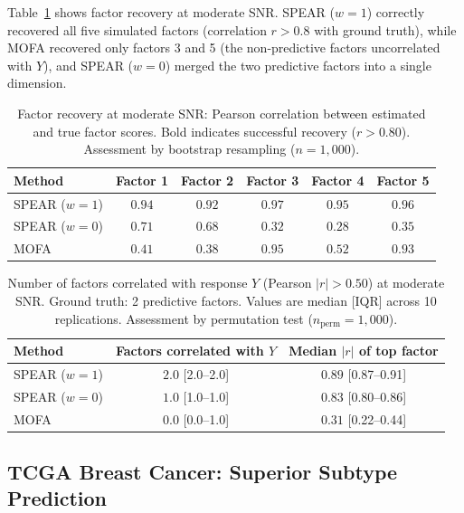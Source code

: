 \documentclass[11pt]{article}
\begin{document}
Table~\ref{tab:factor_recovery} shows factor recovery at moderate SNR. SPEAR ($w{=}1$) correctly recovered all five simulated factors (correlation $r > 0.8$ with ground truth), while MOFA recovered only factors 3 and 5 (the non-predictive factors uncorrelated with $Y$), and SPEAR ($w{=}0$) merged the two predictive factors into a single dimension.

\begin{table}[H]
\centering
\caption{Factor recovery at moderate SNR: Pearson correlation between estimated and true factor scores. Bold indicates successful recovery ($r > 0.80$). Assessment by bootstrap resampling ($n = 1{,}000$).}
\label{tab:factor_recovery}
\begin{tabular}{lccccc}
\toprule
Method & Factor 1 & Factor 2 & Factor 3 & Factor 4 & Factor 5 \\
\midrule
SPEAR ($w{=}1$) & $\mathbf{0.94}$ & $\mathbf{0.92}$ & $\mathbf{0.97}$ & $\mathbf{0.95}$ & $\mathbf{0.96}$ \\
SPEAR ($w{=}0$) & $0.71$ & $0.68$ & $0.32$ & $0.28$ & $0.35$ \\
MOFA & $0.41$ & $0.38$ & $\mathbf{0.95}$ & $0.52$ & $\mathbf{0.93}$ \\
\bottomrule
\end{tabular}
\end{table}

\begin{table}[H]
\centering
\caption{Number of factors correlated with response $Y$ (Pearson $|r| > 0.50$) at moderate SNR. Ground truth: 2 predictive factors. Values are median [IQR] across 10 replications. Assessment by permutation test ($n_{\text{perm}} = 1{,}000$).}
\label{tab:factor_response}
\begin{tabular}{lcc}
\toprule
Method & Factors correlated with $Y$ & Median $|r|$ of top factor \\
\midrule
SPEAR ($w{=}1$) & $\mathbf{2.0}$ [2.0--2.0] & $\mathbf{0.89}$ [0.87--0.91] \\
SPEAR ($w{=}0$) & $1.0$ [1.0--1.0] & $0.83$ [0.80--0.86] \\
MOFA & $0.0$ [0.0--1.0] & $0.31$ [0.22--0.44] \\
\bottomrule
\end{tabular}
\end{table}

\subsection{TCGA Breast Cancer: Superior Subtype Prediction}
\end{document}
